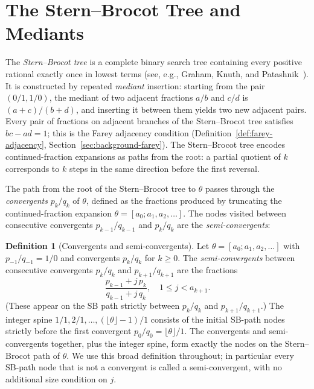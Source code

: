 \documentclass[12pt]{article}
\theoremstyle{definition}
\newtheorem{definition}[theorem]{Definition}
\theoremstyle{remark}
\theoremstyle{plain}
\begin{document}
\section{The Stern--Brocot Tree and Mediants}
\label{sec:background-sb}

The \emph{Stern--Brocot tree} is a complete binary search tree containing every
positive rational exactly once in lowest terms (see, e.g.,
Graham, Knuth, and Patashnik~\cite{gkp1994}).
It is constructed by repeated \emph{mediant} insertion: starting from the pair
$(0/1, 1/0)$, the mediant of two adjacent fractions $a/b$ and $c/d$ is
$(a+c)/(b+d)$, and inserting it between them yields two new adjacent pairs.
Every pair of fractions on adjacent branches of the Stern--Brocot tree satisfies
$bc - ad = 1$; this is the Farey adjacency condition (Definition~\ref{def:farey-adjacency},
Section~\ref{sec:background-farey}).
The Stern--Brocot tree encodes continued-fraction expansions as paths from the root:
a partial quotient of $k$ corresponds to $k$ steps in the same direction before
the first reversal.

The path from the root of the Stern--Brocot tree to $\theta$ passes through the
\emph{convergents} $p_k/q_k$ of $\theta$, defined as the fractions produced by
truncating the continued-fraction expansion $\theta = [a_0; a_1, a_2, \ldots]$.
The nodes visited between consecutive convergents $p_{k-1}/q_{k-1}$ and $p_k/q_k$
are the \emph{semi-convergents}:

\begin{definition}[Convergents and semi-convergents]
\label{def:semi-convergent}
Let $\theta = [a_0; a_1, a_2, \ldots]$ with $p_{-1}/q_{-1} = 1/0$ and
convergents $p_k/q_k$ for $k \geq 0$.
The \emph{semi-convergents} between consecutive convergents $p_k/q_k$ and
$p_{k+1}/q_{k+1}$ are the fractions
\[
  \frac{p_{k-1} + j\,p_k}{q_{k-1} + j\,q_k}, \quad 1 \leq j < a_{k+1}.
\]
(These appear on the SB path strictly between $p_k/q_k$ and $p_{k+1}/q_{k+1}$.)
The integer spine $1/1, 2/1, \ldots, (\lfloor\theta\rfloor-1)/1$ consists of the initial
SB-path nodes strictly before the first convergent $p_0/q_0 = \lfloor\theta\rfloor/1$.
The convergents and semi-convergents together, plus the integer spine, form exactly
the nodes on the Stern--Brocot path of $\theta$.
We use this broad definition throughout; in particular every SB-path node that
is not a convergent is called a semi-convergent, with no additional size
condition on $j$.
\end{definition}
\end{document}
